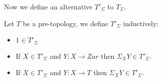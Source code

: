 Now we define an alternative $T'_\Sigma$ to $T_\Sigma$. 

\begin{definition}
Let $T$ be a pre-topology, we define $T'_\Sigma$ inductively:
\begin{itemize}
\item $1\in T'_\Sigma$
\item If $X\in T'_\Sigma$ and $Y:X\to Zar$ then $\Sigma_XY\in T'_\Sigma$.
\item If $X\in T'_\Sigma$ and $Y:X\to T$ then $\Sigma_XY\in T'_\Sigma$.
\end{itemize}
\end{definition}

\begin{lemma}

\end{lemma}




